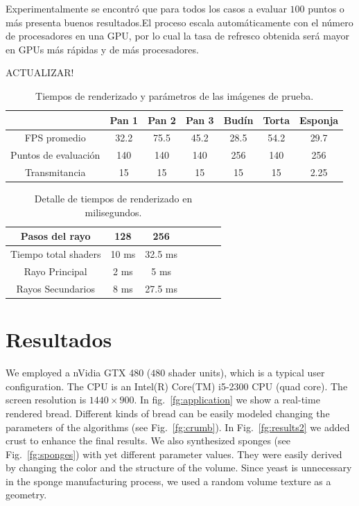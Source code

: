 Experimentalmente se encontró que para todos los casos a evaluar $100$ puntos o más presenta buenos resultados.El proceso escala automáticamente con el número de procesadores en una GPU, por lo cual la tasa de refresco obtenida será mayor en GPUs más rápidas y de más procesadores.


ACTUALIZAR!
\begin{table}[htb]
\centering
\begin{tabular}{|c|c|c|c|c|c|c|}
\hline &  Pan 1 & Pan 2 & Pan 3 & Budín & Torta & Esponja \\
\hline
\hline
 FPS promedio  & 32.2 &  75.5 &  45.2 & 28.5 &  54.2 & 29.7\\
\hline
 Puntos de evaluación &  140 &  140 &  140 & 256 &  140 & 256 \\
\hline
 Transmitancia &  15 &  15 &  15 & 15 &  15 & 2.25 \\
\hline
\end{tabular}
\caption{Tiempos de renderizado y parámetros de las imágenes de prueba.}
\label{tab:n1}
\end{table}

\begin{table}[htb]
\centering
\begin{tabular}{|c|c|c|c|c|c|c|}
\hline
 Pasos del rayo         & 128 &  256 \\
\hline
\hline
 Tiempo total shaders   & 10 ms &  32.5 ms \\
\hline
 Rayo Principal         & 2 ms  & 5 ms  \\
\hline
 Rayos Secundarios      &  8 ms & 27.5 ms  \\
\hline
\end{tabular}
\caption{Detalle de tiempos de renderizado en milisegundos.}
\label{tab:n2}
\end{table}


\section{Resultados}
We employed a nVidia GTX 480 ($480$ shader units), which is a typical user configuration.
The CPU is an Intel(R) Core(TM) i5-2300 CPU (quad core).
The screen resolution is $1440\times900$.
In fig.~\ref{fg:application} we show a real-time rendered bread.
Different kinds of bread can be easily modeled changing the parameters of the algorithms (see Fig.~\ref{fg:crumb}).
In Fig.~\ref{fg:results2} we added crust to enhance the final results. 
We also synthesized sponges (see Fig.~\ref{fg:sponges}) with yet different parameter values.
They were easily derived by changing the color and the structure of the volume.
Since yeast is unnecessary in the sponge manufacturing process, we used a random volume texture as a geometry.

